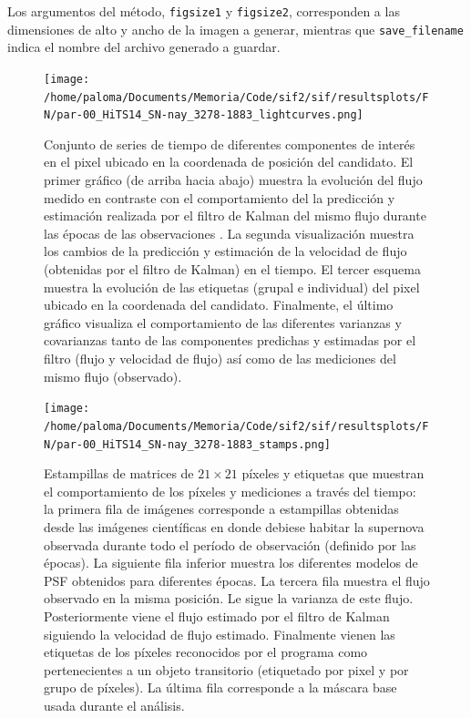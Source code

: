 \begin{itemize}
Los argumentos del m\'etodo, \texttt{figsize1} y \texttt{figsize2}, corresponden a las dimensiones de alto y ancho de la imagen a generar, mientras que \texttt{save\_filename} indica el nombre del archivo generado a guardar.  
\end{itemize}

\begin{figure}[h!]
\centering
\texttt{[image: /home/paloma/Documents/Memoria/Code/sif2/sif/resultsplots/FN/par-00\_HiTS14\_SN-nay\_3278-1883\_lightcurves.png]}
\caption{Conjunto de series de tiempo de diferentes componentes de inter\'es en el pixel ubicado en la coordenada de posici\'on del candidato. El primer gr\'afico (de arriba hacia abajo) muestra la evoluci\'on del flujo medido en contraste con el comportamiento del la predicci\'on y estimaci\'on realizada por el filtro de Kalman del mismo flujo durante las \'epocas de las observaciones . La segunda visualizaci\'on muestra los cambios de la predicci\'on y estimaci\'on de la velocidad de flujo (obtenidas por el filtro de Kalman) en el tiempo. El tercer esquema muestra la evoluci\'on de las etiquetas (grupal e individual) del pixel ubicado en la coordenada del candidato. Finalmente, el \'ultimo gr\'afico visualiza el comportamiento de las diferentes varianzas y covarianzas tanto de las componentes predichas y estimadas por el filtro (flujo y velocidad de flujo) as\'i como de las mediciones del mismo flujo (observado).}
\label{fig:lc_result}
\end{figure}

\begin{figure}[h!]
\centering
\texttt{[image: /home/paloma/Documents/Memoria/Code/sif2/sif/resultsplots/FN/par-00\_HiTS14\_SN-nay\_3278-1883\_stamps.png]}
\caption{Estampillas de matrices de $21 \times 21$ p\'ixeles y etiquetas que muestran el comportamiento de los p\'ixeles y mediciones a trav\'es del tiempo: la primera fila de im\'agenes corresponde a estampillas obtenidas desde las im\'agenes cient\'ificas en donde debiese habitar la supernova observada durante todo el per\'iodo de observaci\'on (definido por las \'epocas). La siguiente fila inferior muestra los diferentes modelos de PSF obtenidos para diferentes \'epocas. La tercera fila muestra el flujo observado en la misma posici\'on. Le sigue la varianza de este flujo. Posteriormente viene el flujo estimado por el filtro de Kalman siguiendo la velocidad de flujo estimado. Finalmente vienen las etiquetas de los p\'ixeles reconocidos por el programa como pertenecientes a un objeto transitorio (etiquetado por pixel y por grupo de p\'ixeles). La \'ultima fila corresponde a la m\'ascara base usada durante el an\'alisis.}
\label{fig:stamps_result}
\end{figure}
\bigskip


